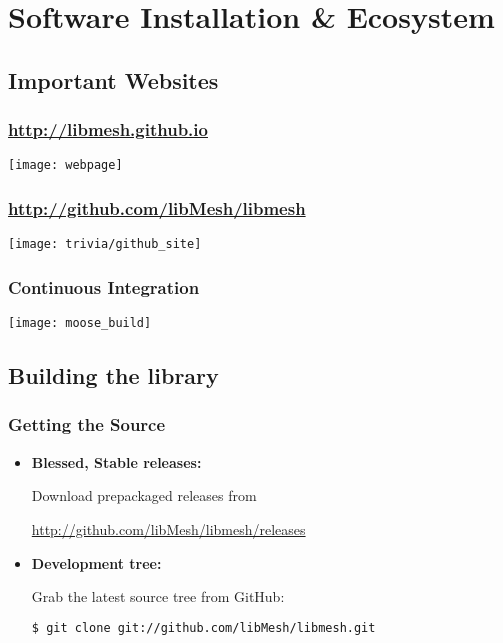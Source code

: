 \section{Software Installation \& Ecosystem}
\subsection{Important Websites}

\frame
{
\frametitle{\url{http://libmesh.github.io}}

\centerline{\texttt{[image: webpage]}}
}


\frame
{
\frametitle{\url{http://github.com/libMesh/libmesh}}

\centerline{\texttt{[image: trivia/github\_site]}}
}


\frame
{
\frametitle{Continuous Integration}

\centerline{\texttt{[image: moose\_build]}}
}



\subsection{Building the library}

\begin{frame}[fragile]
  \frametitle{Getting the \libMesh{} Source}

  \begin{block}{}
    \begin{itemize}
    \item \textbf{Blessed, Stable releases:}

      Download prepackaged releases from

      \scriptsize{\url{http://github.com/libMesh/libmesh/releases}}
      \normalsize
    \item \textbf{Development tree:}

      Grab the latest source tree from GitHub:
      \begin{lstlisting}[language=bash]
$ git clone git://github.com/libMesh/libmesh.git
      \end{lstlisting}
    \end{itemize}
  \end{block}
\end{frame}

